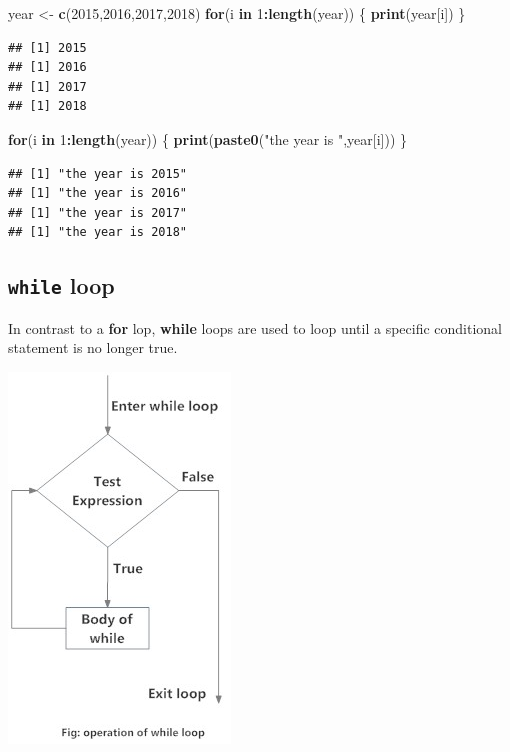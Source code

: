 \documentclass[
]{book}
\newenvironment{Shaded}{\begin{snugshade}}{\end{snugshade}}
\newcommand{\ControlFlowTok}[1]{\textcolor[rgb]{0.13,0.29,0.53}{\textbf{#1}}}
\newcommand{\DecValTok}[1]{\textcolor[rgb]{0.00,0.00,0.81}{#1}}
\newcommand{\KeywordTok}[1]{\textcolor[rgb]{0.13,0.29,0.53}{\textbf{#1}}}
\newcommand{\NormalTok}[1]{#1}
\newcommand{\OperatorTok}[1]{\textcolor[rgb]{0.81,0.36,0.00}{\textbf{#1}}}
\newcommand{\StringTok}[1]{\textcolor[rgb]{0.31,0.60,0.02}{#1}}
\begin{document}
\begin{Shaded}
\begin{Highlighting}[]
\NormalTok{year <-}\StringTok{ }\KeywordTok{c}\NormalTok{(}\DecValTok{2015}\NormalTok{,}\DecValTok{2016}\NormalTok{,}\DecValTok{2017}\NormalTok{,}\DecValTok{2018}\NormalTok{)}
\ControlFlowTok{for}\NormalTok{(i }\ControlFlowTok{in} \DecValTok{1}\OperatorTok{:}\KeywordTok{length}\NormalTok{(year)) \{}
  \KeywordTok{print}\NormalTok{(year[i])}
\NormalTok{\}}
\end{Highlighting}
\end{Shaded}

\begin{verbatim}
## [1] 2015
## [1] 2016
## [1] 2017
## [1] 2018
\end{verbatim}

\begin{Shaded}
\begin{Highlighting}[]
\ControlFlowTok{for}\NormalTok{(i }\ControlFlowTok{in} \DecValTok{1}\OperatorTok{:}\KeywordTok{length}\NormalTok{(year)) \{}
  \KeywordTok{print}\NormalTok{(}\KeywordTok{paste0}\NormalTok{(}\StringTok{"the year is "}\NormalTok{,year[i]))}
\NormalTok{\}}
\end{Highlighting}
\end{Shaded}

\begin{verbatim}
## [1] "the year is 2015"
## [1] "the year is 2016"
## [1] "the year is 2017"
## [1] "the year is 2018"
\end{verbatim}

\hypertarget{while-loop}{%
\subsection*{\texorpdfstring{\texttt{while} loop}{while loop}}\label{while-loop}}

In contrast to a \textbf{for} lop, \textbf{while} loops are used to loop until a specific conditional statement is no longer true.

\includegraphics{img/r-while-loop.jpg}
\end{document}
